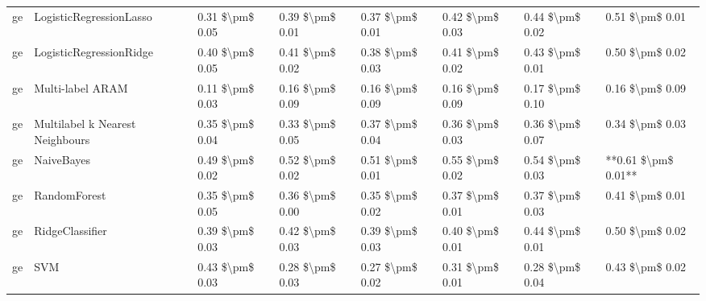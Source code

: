 \begin{tabular}{llllllll}
      ge &         LogisticRegressionLasso & 0.31 \$\textbackslash pm\$ 0.05 &           0.39 \$\textbackslash pm\$ 0.01 &       0.37 \$\textbackslash pm\$ 0.01 &        0.42 \$\textbackslash pm\$ 0.03 &                         0.44 \$\textbackslash pm\$ 0.02 &     0.51 \$\textbackslash pm\$ 0.01 \\
      ge &         LogisticRegressionRidge & 0.40 \$\textbackslash pm\$ 0.05 &           0.41 \$\textbackslash pm\$ 0.02 &       0.38 \$\textbackslash pm\$ 0.03 &        0.41 \$\textbackslash pm\$ 0.02 &                         0.43 \$\textbackslash pm\$ 0.01 &     0.50 \$\textbackslash pm\$ 0.02 \\
      ge &                Multi-label ARAM & 0.11 \$\textbackslash pm\$ 0.03 &           0.16 \$\textbackslash pm\$ 0.09 &       0.16 \$\textbackslash pm\$ 0.09 &        0.16 \$\textbackslash pm\$ 0.09 &                         0.17 \$\textbackslash pm\$ 0.10 &     0.16 \$\textbackslash pm\$ 0.09 \\
      ge & Multilabel k Nearest Neighbours & 0.35 \$\textbackslash pm\$ 0.04 &           0.33 \$\textbackslash pm\$ 0.05 &       0.37 \$\textbackslash pm\$ 0.04 &        0.36 \$\textbackslash pm\$ 0.03 &                         0.36 \$\textbackslash pm\$ 0.07 &     0.34 \$\textbackslash pm\$ 0.03 \\
      ge &                      NaiveBayes & 0.49 \$\textbackslash pm\$ 0.02 &           0.52 \$\textbackslash pm\$ 0.02 &       0.51 \$\textbackslash pm\$ 0.01 &        0.55 \$\textbackslash pm\$ 0.02 &                         0.54 \$\textbackslash pm\$ 0.03 & **0.61 \$\textbackslash pm\$ 0.01** \\
      ge &                    RandomForest & 0.35 \$\textbackslash pm\$ 0.05 &           0.36 \$\textbackslash pm\$ 0.00 &       0.35 \$\textbackslash pm\$ 0.02 &        0.37 \$\textbackslash pm\$ 0.01 &                         0.37 \$\textbackslash pm\$ 0.03 &     0.41 \$\textbackslash pm\$ 0.01 \\
      ge &                 RidgeClassifier & 0.39 \$\textbackslash pm\$ 0.03 &           0.42 \$\textbackslash pm\$ 0.03 &       0.39 \$\textbackslash pm\$ 0.03 &        0.40 \$\textbackslash pm\$ 0.01 &                         0.44 \$\textbackslash pm\$ 0.01 &     0.50 \$\textbackslash pm\$ 0.02 \\
      ge &                             SVM & 0.43 \$\textbackslash pm\$ 0.03 &           0.28 \$\textbackslash pm\$ 0.03 &       0.27 \$\textbackslash pm\$ 0.02 &        0.31 \$\textbackslash pm\$ 0.01 &                         0.28 \$\textbackslash pm\$ 0.04 &     0.43 \$\textbackslash pm\$ 0.02 \\

\end{tabular}
